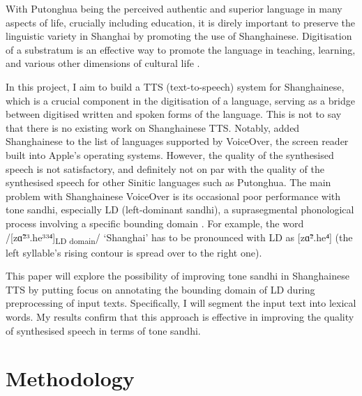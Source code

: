\documentclass[11pt]{article}
\begin{document}
With Putonghua being the perceived authentic and superior language in many aspects of life, crucially including education, it is direly important to preserve the linguistic variety in Shanghai by promoting the use of Shanghainese.
Digitisation of a substratum is an effective way to promote the language in teaching, learning, and various other dimensions of cultural life \citep{villaIntegratingTechnologyMinority2002}.

In this project, I aim to build a TTS (text-to-speech) system for Shanghainese, which is a crucial component in the digitisation of a language, serving as a bridge between digitised written and spoken forms of the language.
This is not to say that there is no existing work on Shanghainese TTS. Notably, \citet{VoiceOver} added Shanghainese to the list of languages supported by VoiceOver, the screen reader built into Apple's operating systems. However, the quality of the synthesised speech is not satisfactory, and definitely not on par with the quality of the synthesised speech for other Sinitic languages such as Putonghua.
The main problem with Shanghainese Voice\-Over is its occasional poor performance with tone sandhi, especially LD (left-dominant sandhi), a suprasegmental phonological process involving a specific bounding domain \citep{robertsAutosegmentalMetricalModelShanghainese2020}.
For example, the word /[zɑ̃²³.he³³⁴]\textsubscript{LD domain}/ `Shanghai' has to be pronounced with LD as [zɑ̃².he⁴] (the left syllable's rising contour is spread over to the right one).

This paper will explore the possibility of improving tone sandhi in Shanghainese TTS by putting focus on annotating the bounding domain of LD during preprocessing of input texts.
Specifically, I will segment the input text into lexical words. My results confirm that this approach is effective in improving the quality of synthesised speech in terms of tone sandhi.

\section{Methodology}
\end{document}
